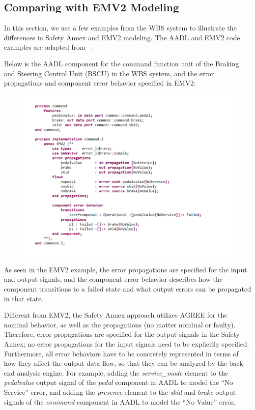 \subsection{Comparing with EMV2 Modeling}
\label{subsec:comparison_with_EMV2}
In this section, we use a few examples from the WBS system to illustrate the differences in Safety Annex and EMV2 modeling. The AADL and EMV2 code examples are adapted from ~\cite{WBS_EMV2_Example}.

Below is the AADL component for the command function unit of the Braking and Steering Control Unit (BSCU) in the WBS system, and the error propagations and component error behavior specified in EMV2:

\begin{figure}[h!]
	\hspace*{-4cm}
\vspace{-0.5in} 
\begin{center}
	\includegraphics[clip,width=1.1\textwidth]{images/bscu_cmd_comp.pdf}
	\end{center}
\vspace{-0.4in}
\end{figure}

As seen in the EMV2 example, the error propagations are specified for the input and output signals, and the component error behavior describes how the component transitions to a failed state and what output errors can be propagated in that state.

Different from EMV2, the Safety Annex approach utilizes AGREE for the nominal behavior, as well as the propagations (no matter nominal or faulty). Therefore, error propagations are specified for the output signals in the Safety Annex; no error propagations for the input signals need to be explicitly specified. Furthermore, all error behaviors have to be concretely represented in terms of how they affect the output data flow, so that they can be analyzed by the back-end analysis engine. For example, adding the {\em service\_mode} element to the {\em pedalvalue} output signal of the {\em pedal} component in AADL to model the ``No Service'' error, and adding the {\em presence} element to the {\em skid} and {\em brake} output signals of the {\em command} component in AADL to model the ``No Value'' error.


